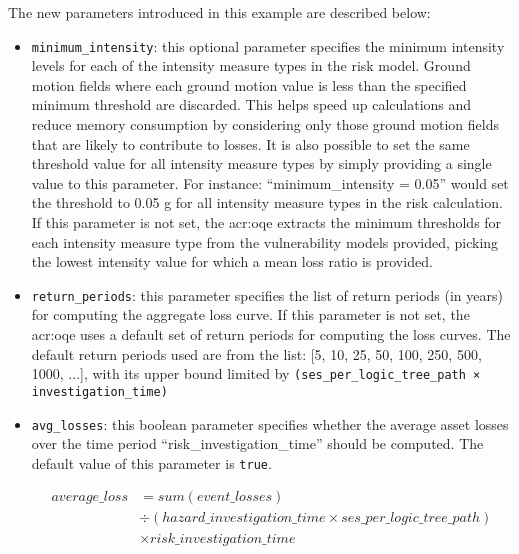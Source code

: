 The new parameters introduced in this example are described below:

\begin{itemize}

  \item \Verb+minimum_intensity+: this optional parameter specifies the minimum
    intensity levels for each of the intensity measure types in the risk model.
    Ground motion fields where each ground motion value is less than the 
    specified minimum threshold are discarded. This helps speed up calculations
    and reduce memory consumption by considering only those ground motion fields
    that are likely to contribute to losses. It is also possible to set the same
    threshold value for all intensity measure types by simply providing a single
    value to this parameter. For instance: ``minimum\_intensity = 0.05'' would
    set the threshold to 0.05 g for all intensity measure types in the risk 
    calculation.
    If this parameter is not set, the \glsdesc{acr:oqe} extracts the minimum
    thresholds for each intensity measure type from the vulnerability
    models provided, picking the lowest intensity value for which a mean loss
    ratio is provided.

  \item \Verb+return_periods+: this parameter specifies the list of return
    periods (in years) for computing the aggregate loss curve.
    If this parameter is not set, the \glsdesc{acr:oqe} uses a default set of
    return periods for computing the loss curves. The default return periods
    used are from the list: [5, 10, 25, 50, 100, 250, 500, 1000, ...], with 
    its upper bound limited by \Verb+(ses_per_logic_tree_path × investigation_time)+

  \item \Verb+avg_losses+: this boolean parameter specifies whether the average
    asset losses over the time period ``risk\_investigation\_time'' should be
    computed. The default value of this parameter is \Verb+true+.

    \begin{equation*}
    \begin{split}
    average\_loss & = sum(event\_losses) \\
                 & \div (hazard\_investigation\_time \times ses\_per\_logic\_tree\_path) \\
                 & \times risk\_investigation\_time
    \end{split}
    \end{equation*}

\end{itemize}

